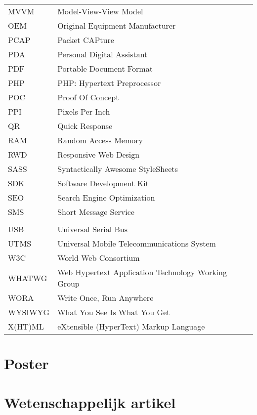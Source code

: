\documentclass[master=cws,dutch,masteroption={vs,gs},inputenc=utf8]{kulemt}
\begin{document}
\begin{flushleft}
\begin{longtable}{p{2cm} l}
     MVVM & Model-View-View Model \\
     OEM & Original Equipment Manufacturer \\
     PCAP & Packet CAPture \\
     PDA & Personal Digital Assistant \\
     PDF & Portable Document Format \\
     PHP & PHP: Hypertext Preprocessor \\
     POC & Proof Of Concept \\
     PPI & Pixels Per Inch \\
     QR & Quick Response \\
     RAM & Random Access Memory \\
     RWD & Responsive Web Design \\
     SASS & Syntactically Awesome StyleSheets \\
     SDK & Software Development Kit \\
     SEO & Search Engine Optimization \\
     SMS & Short Message Service \\
     \sta{} & \st{} \\
     USB & Universal Serial Bus \\
     UTMS & Universal Mobile Telecommunications System \\
     W3C & World Web Consortium \\
     WHATWG & Web Hypertext Application Technology Working Group \\
     WORA & Write Once, Run Anywhere \\
     WYSIWYG & What You See Is What You Get \\
     X(HT)ML & eXtensible (HyperText) Markup Language \\ 
  \end{longtable}
\end{flushleft}

\mainmatter













\appendixpage*          
\appendix
\chapter{Poster}

\chapter{Wetenschappelijk artikel}




\backmatter
\makeatletter
\g@addto@macro{\UrlBreaks}{\UrlOrds}
\makeatother


\end{document}
